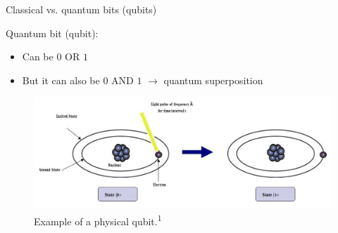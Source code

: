 \documentclass[10pt]{beamer}
\begin{document}
{
\begin{frame}[fragile]{Classical vs. quantum bits (qubits)}

Quantum bit (qubit):
\begin{itemize}
\item Can be $0$ OR $1$
\item But it can also be $0$ AND $1$ $\rightarrow$ quantum superposition
\end{itemize}

\begin{figure}
\includegraphics[scale=0.3]{qubitimplementation.jpeg}
\caption{Example of a physical qubit.\textsuperscript{1}}
\end{figure}

\end{frame}
}
\end{document}

